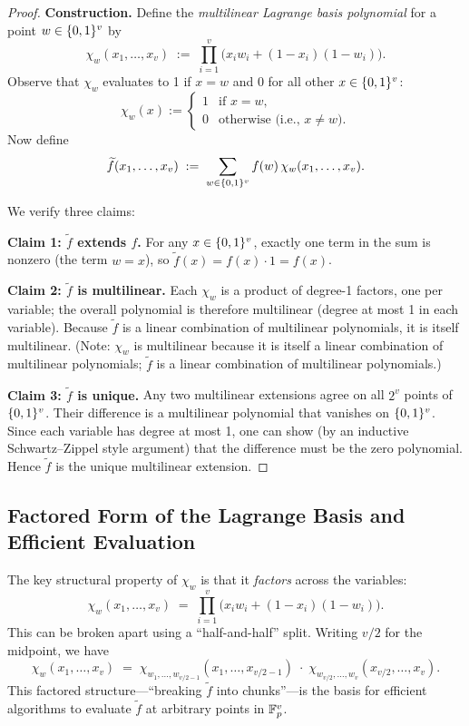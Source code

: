 \documentclass[11pt]{article}
\begin{document}
\begin{proof}
\textbf{Construction.} Define the \emph{multilinear Lagrange basis polynomial} for a point
$w \in \{0,1\}^v$ by
\[
  \chi_w(x_1, \ldots, x_v)
  \;:=\;
  \prod_{i=1}^{v} \bigl( x_i w_i + (1 - x_i)(1 - w_i) \bigr).
\]
Observe that $\chi_w$ evaluates to 1 if $x = w$ and 0 for all other $x \in \{0,1\}^v$:
\[
  \chi_w(x) :=
  \begin{cases}
    1 & \text{if } x = w, \\
    0 & \text{otherwise (i.e., } x \neq w\text{)}.
  \end{cases}
\]
Now define
\[
  \widetilde{f}(x_1, \ldots, x_v)
  \;:=\;
  \sum_{w \in \{0,1\}^v} f(w)\,\chi_w(x_1, \ldots, x_v).
\]

We verify three claims:

\medskip
\textbf{Claim 1: $\widetilde{f}$ extends $f$.}
For any $x \in \{0,1\}^v$, exactly one term in the sum is nonzero (the term $w = x$), so
$\widetilde{f}(x) = f(x) \cdot 1 = f(x)$.

\medskip
\textbf{Claim 2: $\widetilde{f}$ is multilinear.}
Each $\chi_w$ is a product of degree-1 factors, one per variable; the overall polynomial
is therefore multilinear (degree at most 1 in each variable).
Because $\widetilde{f}$ is a linear combination of multilinear polynomials, it is itself
multilinear.
(Note: $\chi_w$ is multilinear because it is itself a linear combination of multilinear
polynomials; $\widetilde{f}$ is a linear combination of multilinear polynomials.)

\medskip
\textbf{Claim 3: $\widetilde{f}$ is unique.}
Any two multilinear extensions agree on all $2^v$ points of $\{0,1\}^v$.
Their difference is a multilinear polynomial that vanishes on $\{0,1\}^v$.
Since each variable has degree at most 1, one can show (by an inductive Schwartz--Zippel
style argument) that the difference must be the zero polynomial.
Hence $\widetilde{f}$ is the unique multilinear extension.
\end{proof}

\subsection{Factored Form of the Lagrange Basis and Efficient Evaluation}

The key structural property of $\chi_w$ is that it \emph{factors} across the variables:
\[
  \chi_w(x_1, \ldots, x_v)
  \;=\;
  \prod_{i=1}^{v} \bigl( x_i w_i + (1-x_i)(1-w_i) \bigr).
\]
This can be broken apart using a ``half-and-half'' split.
Writing $v/2$ for the midpoint, we have
\[
  \chi_w(x_1, \ldots, x_v)
  \;=\;
  \chi_{w_1,\ldots,w_{v/2-1}}(x_1, \ldots, x_{v/2-1})
  \;\cdot\;
  \chi_{w_{v/2},\ldots,w_{v}}(x_{v/2}, \ldots, x_v).
\]
This factored structure---``breaking $\widetilde{f}$ into chunks''---is the basis for efficient
algorithms to evaluate $\widetilde{f}$ at arbitrary points in $\mathbb{F}_p^v$.
\end{document}
